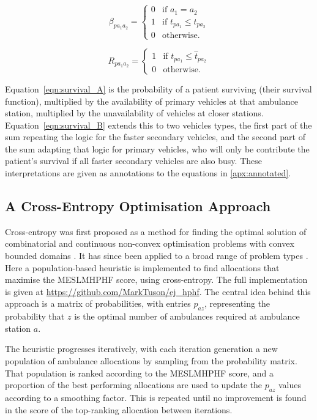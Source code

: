 \documentclass[preprint,12pt]{elsarticle}
\begin{document}
\begin{equation}\label{eqn:beta}
\beta_{p a_1 a_2} = \begin{cases}
    0 & \text{if } a_1 = a_2\\
    1 & \text{if } t_{p a_1} \leq t_{p a_2}\\
    0 & \text{otherwise.}
\end{cases}
\end{equation}

\begin{equation}\label{eqn:R}
R_{p a_1 a_2} = \begin{cases}
    1 & \text{if } t_{p a_1} \leq \hat{t}_{p a_2}\\
    0 & \text{otherwise.}
\end{cases}
\end{equation}

Equation~\ref{eqn:survival_A} is the probability of a patient surviving (their survival function), multiplied by the availability of primary vehicles at that ambulance station, multiplied by the unavailability of vehicles at closer stations.
Equation~\ref{eqn:survival_B} extends this to two vehicles types, the first part of the sum repeating the logic for the faster secondary vehicles, and the second part of the sum adapting that logic for primary vehicles, who will only be contribute the patient's survival if all faster secondary vehicles are also busy. These interpretations are given as annotations to the equations in \ref{apx:annotated}.

\subsection{A Cross-Entropy Optimisation Approach}\label{sec:cross_entropy}
Cross-entropy was first proposed as a method for finding the optimal solution of combinatorial and continuous non-convex optimisation problems with convex bounded domains \cite{RubinsteinReuven1999TCMf}. It has since been applied to a broad range of problem types \cite{deBoerPieter-Tjerk2005ATot}. Here a population-based heuristic is implemented to find allocations that maximise the MESLMHPHF score, using cross-entropy. The full implementation is given at \url{https://github.com/MarkTuson/ej_hphf}. The central idea behind this approach is a matrix of probabilities, with entries $p_{az}$, representing the probability that $z$ is the optimal number of ambulances required at ambulance station $a$.

The heuristic progresses iteratively, with each iteration generation a new population of ambulance allocations by sampling from the probability matrix. That population is ranked according to the MESLMHPHF score, and a proportion of the best performing allocations are used to update the $p_{az}$ values according to a smoothing factor. This is repeated until no improvement is found in the score of the top-ranking allocation between iterations.
\end{document}
